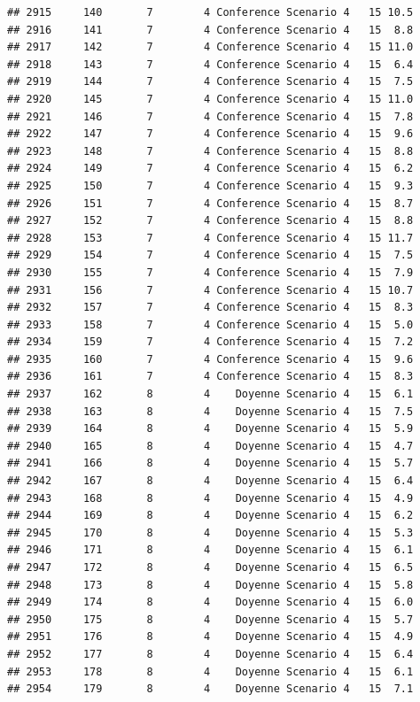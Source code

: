 \documentclass[
]{article}
\begin{document}
\begin{verbatim}
## 2915     140       7        4 Conference Scenario 4   15 10.5
## 2916     141       7        4 Conference Scenario 4   15  8.8
## 2917     142       7        4 Conference Scenario 4   15 11.0
## 2918     143       7        4 Conference Scenario 4   15  6.4
## 2919     144       7        4 Conference Scenario 4   15  7.5
## 2920     145       7        4 Conference Scenario 4   15 11.0
## 2921     146       7        4 Conference Scenario 4   15  7.8
## 2922     147       7        4 Conference Scenario 4   15  9.6
## 2923     148       7        4 Conference Scenario 4   15  8.8
## 2924     149       7        4 Conference Scenario 4   15  6.2
## 2925     150       7        4 Conference Scenario 4   15  9.3
## 2926     151       7        4 Conference Scenario 4   15  8.7
## 2927     152       7        4 Conference Scenario 4   15  8.8
## 2928     153       7        4 Conference Scenario 4   15 11.7
## 2929     154       7        4 Conference Scenario 4   15  7.5
## 2930     155       7        4 Conference Scenario 4   15  7.9
## 2931     156       7        4 Conference Scenario 4   15 10.7
## 2932     157       7        4 Conference Scenario 4   15  8.3
## 2933     158       7        4 Conference Scenario 4   15  5.0
## 2934     159       7        4 Conference Scenario 4   15  7.2
## 2935     160       7        4 Conference Scenario 4   15  9.6
## 2936     161       7        4 Conference Scenario 4   15  8.3
## 2937     162       8        4    Doyenne Scenario 4   15  6.1
## 2938     163       8        4    Doyenne Scenario 4   15  7.5
## 2939     164       8        4    Doyenne Scenario 4   15  5.9
## 2940     165       8        4    Doyenne Scenario 4   15  4.7
## 2941     166       8        4    Doyenne Scenario 4   15  5.7
## 2942     167       8        4    Doyenne Scenario 4   15  6.4
## 2943     168       8        4    Doyenne Scenario 4   15  4.9
## 2944     169       8        4    Doyenne Scenario 4   15  6.2
## 2945     170       8        4    Doyenne Scenario 4   15  5.3
## 2946     171       8        4    Doyenne Scenario 4   15  6.1
## 2947     172       8        4    Doyenne Scenario 4   15  6.5
## 2948     173       8        4    Doyenne Scenario 4   15  5.8
## 2949     174       8        4    Doyenne Scenario 4   15  6.0
## 2950     175       8        4    Doyenne Scenario 4   15  5.7
## 2951     176       8        4    Doyenne Scenario 4   15  4.9
## 2952     177       8        4    Doyenne Scenario 4   15  6.4
## 2953     178       8        4    Doyenne Scenario 4   15  6.1
## 2954     179       8        4    Doyenne Scenario 4   15  7.1

\end{verbatim}
\end{document}
